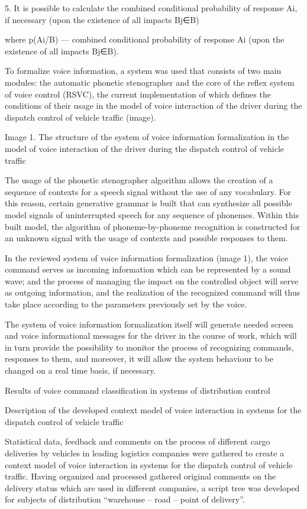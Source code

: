 5. It is possible to calculate the combined conditional probability of response Ai, if necessary (upon the existence of all impacts Bj∈B)

where p(Ai/B) — combined conditional probability of response Ai (upon the existence of all impacts Bj∈B).

To formalize voice information, a system was used that consists of two main modules: the automatic phonetic stenographer and the core of the reflex system of voice control (RSVC), the current implementation of which defines the conditions of their usage in the model of voice interaction of the driver during the dispatch control of vehicle traffic (image). 

Image 1. The structure of the system of voice information formalization in the model of voice interaction of the driver during the dispatch control of vehicle traffic

The usage of the phonetic stenographer algorithm allows the creation of a sequence of contexts for a speech signal without the use of any vocabulary. For this reason, certain generative grammar is built that can synthesize all possible model signals of uninterrupted speech for any sequence of phonemes. Within this built model, the algorithm of phoneme-by-phoneme recognition is constructed for an unknown signal with the usage of contexts and possible responses to them. 

In the reviewed system of voice information formalization (image 1), the voice command serves as incoming information which can be represented by a sound wave; and the process of managing the impact on the controlled object will serve as outgoing information, and the realization of the recognized command will thus take place according to the parameters previously set by the voice. 

The system of voice information formalization itself will generate needed screen and voice informational messages for the driver in the course of work, which will in turn provide the possibility to monitor the process of recognizing commands, responses to them, and moreover, it will allow the system behaviour to be changed on a real time basis, if necessary. 

Results of voice command classification in systems of distribution control 

Description of the developed context model of voice interaction in systems for the dispatch control of vehicle traffic 

Statistical data, feedback and comments on the process of different cargo deliveries by vehicles in leading logistics companies were gathered to create a context model of voice interaction in systems for the dispatch control of vehicle traffic. Having organized and processed gathered original comments on the delivery status which are used in different companies, a script tree was developed for subjects of distribution “warehouse – road – point of delivery”. 

